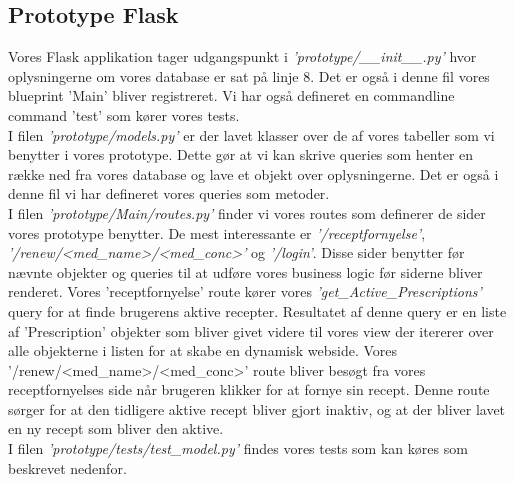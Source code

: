 \subsection{Prototype Flask}
Vores Flask applikation tager udgangspunkt i \textit{'prototype/\_\_init\_\_.py'} hvor oplysningerne om vores database er sat på linje 8. Det er også i denne fil vores blueprint 'Main' bliver registreret. Vi har også defineret en commandline command 'test' som kører vores tests.\\
I filen \textit{'prototype/models.py'} er der lavet klasser over de af vores tabeller som vi benytter i vores prototype. Dette gør at vi kan skrive queries som henter en række ned fra vores database og lave et objekt over oplysningerne. Det er også i denne fil vi har defineret vores queries som metoder.\\
I filen \textit{'prototype/Main/routes.py'} finder vi vores routes som definerer de sider vores prototype benytter. De mest interessante er \textit{'/receptfornyelse'}, \textit{'/renew/<med\_name>/<med\_conc>'} og \textit{'/login'}. Disse sider benytter før nævnte objekter og queries til at udføre vores business logic før siderne bliver renderet. Vores 'receptfornyelse' route kører vores \textit{'get\_Active\_Prescriptions'} query for at finde brugerens aktive recepter. Resultatet af denne query er en liste af 'Prescription' objekter som bliver givet videre til vores view der itererer over alle objekterne i listen for at skabe en dynamisk webside. Vores '/renew/<med\_name>/<med\_conc>' route bliver besøgt fra vores receptfornyelses side når brugeren klikker for at fornye sin recept. Denne route sørger for at den tidligere aktive recept bliver gjort inaktiv, og at der bliver lavet en ny recept som bliver den aktive.\\
I filen \textit{'prototype/tests/test\_model.py'} findes vores tests som kan køres som beskrevet nedenfor.
